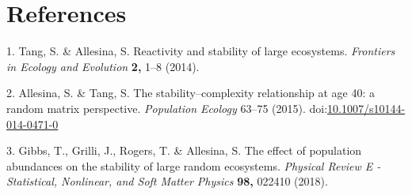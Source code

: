 \documentclass[]{article}
\begin{document}
\section*{References}\label{references}

\hypertarget{refs}{}
\hypertarget{ref-Tang2014b}{}
1. Tang, S. \& Allesina, S. Reactivity and stability of large
ecosystems. \emph{Frontiers in Ecology and Evolution} \textbf{2,} 1--8
(2014).

\hypertarget{ref-Allesina2015a}{}
2. Allesina, S. \& Tang, S. The stability--complexity relationship at
age 40: a random matrix perspective. \emph{Population Ecology} 63--75
(2015).
doi:\href{https://doi.org/10.1007/s10144-014-0471-0}{10.1007/s10144-014-0471-0}

\hypertarget{ref-Gibbs2017}{}
3. Gibbs, T., Grilli, J., Rogers, T. \& Allesina, S. The effect of
population abundances on the stability of large random ecosystems.
\emph{Physical Review E - Statistical, Nonlinear, and Soft Matter
Physics} \textbf{98,} 022410 (2018).
\end{document}
